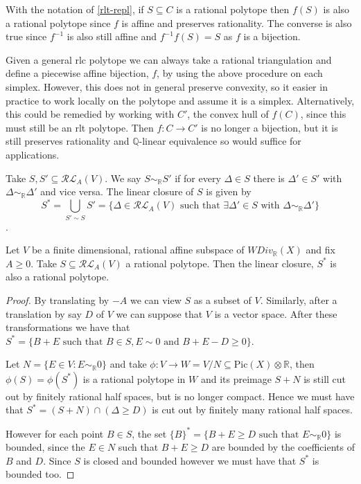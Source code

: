 \documentclass[a4paper,12pt]{amsart}
\begin{document}
\begin{remark}
	With the notation of \autoref{rlt-repl}, if $S \subseteq C$ is a rational polytope then $f(S)$ is also a rational polytope since $f$ is affine and preserves rationality. The converse is also true since $f^{-1}$ is also still affine and $f^{-1}f(S)=S$ as $f$ is a bijection.  
\end{remark}


	Given a general rlc polytope we can always take a rational triangulation and define a piecewise affine bijection, $f$, by using the above procedure on each simplex. However, this does not in general preserve convexity, so it easier in practice to work locally on the polytope and assume it is a simplex. Alternatively, this could be remedied by working with $C'$, the convex hull of $f(C)$, since this must still be an rlt polytope. Then $f\colon C \to C'$ is no longer a bijection, but it is still preserves rationality and $\mathbb{Q}$-linear equivalence so would suffice for applications. 

	
	\begin{definition}
		Take $S, S' \subseteq \mathcal{RL}_{A}(V)$. We say $S \sim_{\mathbb{R}} S'$ if for every $\Delta \in S$ there is $\Delta' \in S'$ with $\Delta \sim_{\mathbb{R}} \Delta'$ and vice versa. The linear closure of $S$ is given by $$S^{*}=\bigcup_{S' \sim S}S'= \{\Delta \in \mathcal{RL}_{A}(V) \text{ such that } \exists \Delta' \in S \text{ with }\Delta \sim_{\mathbb{R}} \Delta'\}$$.
	\end{definition}
	
	

	\begin{lemma}
		Let $V$ be a finite dimensional, rational affine subspace of $WDiv_{\mathbb{R}}(X)$ and fix $A \geq 0$. Take $S \subseteq \mathcal{RL}_{A}(V)$ a rational polytope. Then the linear closure, $S^{*}$ is also a rational polytope. 
	\end{lemma}
	
	\begin{proof}
		By translating by $-A$ we can view $S$ as a subset of $V$. Similarly, after a translation by say $D$ of $V$ we can suppose that $V$ is a vector space. After these transformations we have that $S^{*}=\{B+E \text{ such that } B\in S, E \sim 0 \text{ and } B+E -D \geq 0\}$.
		
		
		Let $N=\{E \in V: E \sim_{\mathbb{R}} 0\}$ and take $\phi:V \to W=V/N \subseteq \text{Pic}(X)\otimes \mathbb{R}$, then $\phi(S)=\phi(S^{*})$ is a rational polytope in $W$ and its preimage $S+N$ is still cut out by finitely rational half spaces, but is no longer compact. Hence we must have that $S^{*}=(S+N)\cap({\Delta \geq D})$ is cut out by finitely many rational half spaces. 
		
		However for each point $B \in S$, the set $\{B\}^{*}=\{B+E\geq D \text{ such that } E \sim_{\mathbb{R}} 0\}$ is bounded, since the $E\in N$ such that $B+E \geq D$ are bounded by the coefficients of $B$ and $D$. Since $S$ is closed and bounded however we must have that $S^{*}$ is bounded too.
	\end{proof}
	
\end{document}
